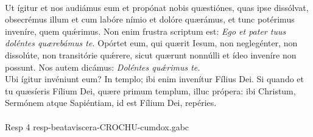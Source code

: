 \documentclass[options]{article}
\begin{document}
\\
Ut ígitur et nos audiámus eum et propónat nobis quæstiónes, quas ipse dissólvat, obsecrémus illum et cum labóre nímio et dolóre quærámus, et tunc potérimus inveníre, quem qu\'{æ}rimus. Non enim frustra scriptum est: \emph{Ego et pater tuus doléntes quærebámus te.} Opórtet eum, qui quærit Iesum, non neglegénter, non dissolúte, non transitórie qu\'{æ}rere, sicut quærunt nonnúlli et ídeo inveníre non possunt. Nos autem dicámus: \emph{Doléntes qu\'{æ}rimus te.}\\
Ubi ígitur invéniunt eum? In templo; ibi enim invenítur Fílius Dei. Si quando et tu quæsíeris Fílium Dei, quære primum templum, illuc própera: ibi Christum, Sermónem atque Sapiéntiam, id est Fílium Dei, repéries.\\
\\
Resp 4 resp-beataviscera-CROCHU-cumdox.gabc\\
\\	
\end{document}
